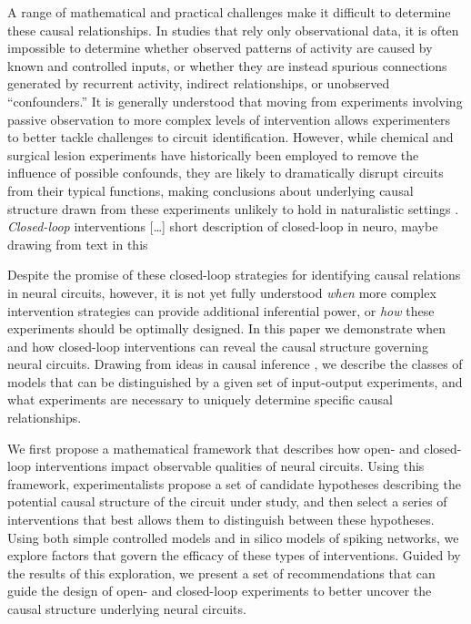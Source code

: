 A range of mathematical and practical challenges make it difficult to
determine these causal relationships. In studies that rely only
observational data, it is often impossible to determine whether observed
patterns of activity are caused by known and controlled inputs, or
whether they are instead spurious connections generated by recurrent
activity, indirect relationships, or unobserved ``confounders.'' It is
generally understood that moving from experiments involving passive
observation to more complex levels of intervention allows experimenters
to better tackle challenges to circuit identification. However, while
chemical and surgical lesion experiments have historically been employed
to remove the influence of possible confounds, they are likely to
dramatically disrupt circuits from their typical functions, making
conclusions about underlying causal structure drawn from these
experiments unlikely to hold in naturalistic settings .
\emph{Closed-loop} interventions {[}\ldots{]} short description of
closed-loop in neuro, maybe drawing from text in this

Despite the promise of these closed-loop strategies for identifying
causal relations in neural circuits, however, it is not yet fully
understood \emph{when} more complex intervention strategies can provide
additional inferential power, or \emph{how} these experiments should be
optimally designed. In this paper we demonstrate when and how
closed-loop interventions can reveal the causal structure governing
neural circuits. Drawing from ideas in causal inference , we describe
the classes of models that can be distinguished by a given set of
input-output experiments, and what experiments are necessary to uniquely
determine specific causal relationships.

We first propose a mathematical framework that describes how open- and
closed-loop interventions impact observable qualities of neural
circuits. Using this framework, experimentalists propose a set of
candidate hypotheses describing the potential causal structure of the
circuit under study, and then select a series of interventions that best
allows them to distinguish between these hypotheses. Using both simple
controlled models and in silico models of spiking networks, we explore
factors that govern the efficacy of these types of interventions. Guided
by the results of this exploration, we present a set of recommendations
that can guide the design of open- and closed-loop experiments to better
uncover the causal structure underlying neural circuits.

